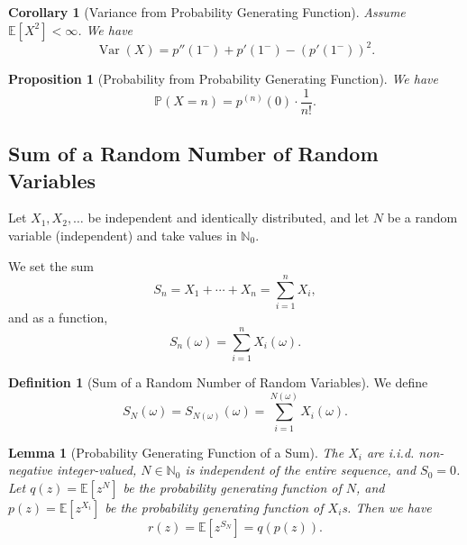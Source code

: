 \documentclass[11pt]{article}
\numberwithin{equation}{section}
\newtheorem{lemma}[theorem]{Lemma}
\newtheorem{proposition}[theorem]{Proposition}
\newtheorem{corollary}[theorem]{Corollary}
\theoremstyle{definition}
\newtheorem{definition}[theorem]{Definition}
\theoremstyle{remark}
\newcommand{\pqty}[1]{\left(#1\right)}
\newcommand{\bqty}[1]{\left[#1\right]}
\newcommand{\NN}{\mathbb N}
\newcommand{\Prob}{\mathbb P}
\newcommand{\Expt}{\mathbb E}
\DeclareMathOperator{\Var}{Var}
\begin{document}
\begin{corollary}[Variance from Probability Generating Function]\label{probability-corollary-007}
    \label{probability-cor:var-pgf}%
Assume \(\Expt[X^2]<\infty\).
    We have
    \[
        \Var\pqty{X} = p''\pqty{1^-} + p'\pqty{1^-} - \pqty{p'\pqty{1^-}}^2.
    \]
\end{corollary}

\begin{proposition}[Probability from Probability Generating Function]\label{probability-proposition-025}
    \label{probability-prop:prob-pgf}%
    We have
    \[
        \Prob\pqty{X = n} = p^{\pqty{n}} \pqty{0} \cdot \frac{1}{n!}.
    \]
\end{proposition}

\subsection{Sum of a Random Number of Random Variables}

Let \(X_1, X_2, \ldots\) be independent and identically distributed, and let \(N\) be a random variable (independent) and take values in \(\NN_0\).

We set the sum
\[
    S_n = X_1 + \cdots + X_n = \sum_{i = 1}^{n} X_i,
\]
and as a function,
\[
    S_n\pqty{\omega} = \sum_{i = 1}^{n} X_i\pqty{\omega}.
\]

\begin{definition}[Sum of a Random Number of Random Variables]\label{probability-definition-040}
    \label{probability-def:sum-random-number-rvs}%
    We define
    \[
        S_N \pqty{\omega} = S_{N\pqty{\omega}} \pqty{\omega} = \sum_{i = 1}^{N\pqty{\omega}} X_i\pqty{\omega}.
    \]
\end{definition}

\begin{lemma}[Probability Generating Function of a Sum]\label{probability-lemma-008}
    \label{probability-lem:pgf-sum}
The \(X_i\) are i.i.d. non-negative integer-valued, \(N\in\NN_0\) is independent of the entire sequence, and \(S_0=0\).
%
    Let \(q\pqty{z} = \Expt\bqty{z^N}\) be the probability generating function of \(N\), and \(p\pqty{z} = \Expt\bqty{z^{X_i}}\) be the probability generating function of \(X_i\)s. Then we have
    \[
        r\pqty{z} = \Expt\bqty{z^{S_N}} = q\pqty{p\pqty{z}}.
    \]
\end{lemma}
\end{document}
